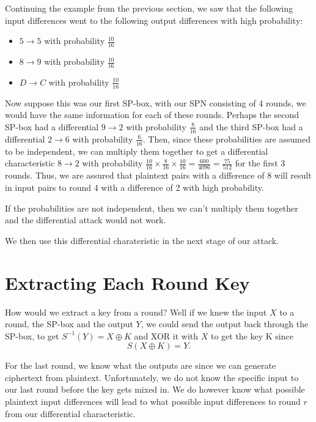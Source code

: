 \begin{example}
Continuing the example from the previous section, we saw that the following
input differences went to the following output differences with high
probability:
\begin{itemize}
\item $5 \rightarrow 5$ with probability $\frac{10}{16}$
\item $8 \rightarrow 9$ with probability $\frac{10}{16}$
\item $D \rightarrow C$ with probability $\frac{10}{16}$
\end{itemize}
Now suppose this was our first SP-box, with our SPN consisting of 4 rounds, we
would have the same information for each of these rounds. Perhaps the second
SP-box had a differential $9 \rightarrow 2$ with probability $\frac{8}{16}$
and the third SP-box had a differential $2 \rightarrow 6$ with probability 
$\frac{6}{16}$. Then, since these probabilities are assumed to be independent,
we can multiply them together to get a differential characteristic $8 \rightarrow
2$ with probability $\frac{10}{16} \times \frac{8}{16} \times \frac{10}{16} = 
\frac{600}{4096} = \frac{75}{512}$ for the first 3 rounds. Thus, we are assured
that plaintext pairs with a difference of 8 will result in input pairs to round
4 with a difference of 2 with high probability.
\end{example}

\begin{rem}
If the probabilities are not independent, then we can't multiply them together
and the differential attack would not work.
\end{rem}

We then use this differential charateristic in the next stage of our attack.

\section{Extracting Each Round Key}
How would we extract a key from a round? Well if we knew the input $X$ to a round,
the SP-box and the output $Y$, we could send the output back through the SP-box, to
get $S^{-1}(Y) = X \oplus K $ and XOR it with $X$ to get the key K since
\begin{equation}
S(X \oplus K) = Y.
\end{equation}

For the last round, we know what the outputs are since we can generate ciphertext
from plaintext. Unfortunately, we do not know the specific input to our last round
before the key gets mixed in. We do however know what possible plaintext input 
differences will lead to what possible input differences to round $r$ from our 
differential characteristic.

